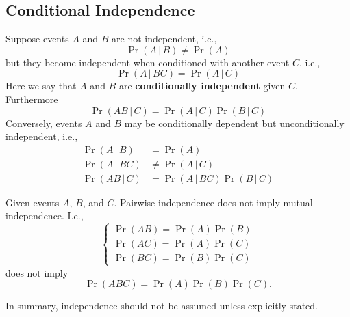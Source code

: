 \documentclass{article}
\begin{document}
\subsection{Conditional Independence}
\begin{definition}
    Suppose events \(A\) and \(B\) are not independent, i.e.,
    \begin{equation*}
        \Pr{\left( A \,\vert\, B \right)} \neq \Pr{\left( A \right)}
    \end{equation*}
    but they become independent when conditioned with another event \(C\), i.e.,
    \begin{equation*}
        \Pr{\left( A \,\vert\, BC \right)} = \Pr{\left( A \,\vert\, C \right)}
    \end{equation*}
    Here we say that \(A\) and \(B\) are \textbf{conditionally independent} given \(C\). Furthermore
    \begin{equation*}
        \Pr{\left( AB \,\vert\, C \right)} = \Pr{\left( A \,\vert\, C \right)} \Pr{\left( B \,\vert\, C \right)}
    \end{equation*}
    Conversely, events \(A\) and \(B\) may be conditionally dependent but unconditionally independent, i.e.,
    \begin{align*}
        \Pr{\left( A \,\vert\, B \right)}  & = \Pr{\left( A \right)}                                                \\
        \Pr{\left( A \,\vert\, BC \right)} & \neq \Pr{\left( A \,\vert\, C \right)}                                 \\
        \Pr{\left( AB \,\vert\, C \right)} & = \Pr{\left( A \,\vert\, BC \right)} \Pr{\left( B \,\vert\, C \right)}
    \end{align*}
\end{definition}
\begin{theorem}
    Given events \(A\), \(B\), and \(C\). Pairwise independence does not imply mutual independence. I.e.,
    \begin{equation*}
        \begin{cases}
            \Pr{\left( A B \right)} = \Pr{\left( A \right)} \Pr{\left( B \right)} \\
            \Pr{\left( A C \right)} = \Pr{\left( A \right)} \Pr{\left( C \right)} \\
            \Pr{\left( B C \right)} = \Pr{\left( B \right)} \Pr{\left( C \right)}
        \end{cases}
    \end{equation*}
    does not imply
    \begin{equation*}
        \Pr{\left( A B C \right)} = \Pr{\left( A \right)} \Pr{\left( B \right)} \Pr{\left( C \right)}.
    \end{equation*}
\end{theorem}
In summary, independence should not be assumed unless explicitly stated.
\end{document}
